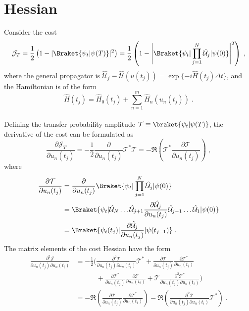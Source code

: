 \chapter{Hessian}

Consider the cost
\begin{equation}
	\mathcal{J}_T = \frac{1}{2} \left( 1- |\Braket{\psi_t | \psi (T)}|^2 \right)  = \frac{1}{2} \left( 1- \Bigg|\Braket{\psi_t | \prod_{j = 1}^{N} \hat{\mathcal{U}}_j |\psi (0)} \Bigg| ^2 \right) \; ,
\end{equation}
where the general propagator is $\hat{\mathcal{U}}_j \equiv \hat{\mathcal{U}} (u(t_j)) = \exp \{ -i \hat{H} (t_j) \Delta t \}$, and the Hamiltonian is of the form
\begin{equation}
	\hat{H}(t_j) =  \hat{H}_0 (t_j) + \sum_{n = 1}^{m}  \hat{H}_n (u_n (t_j)) \; .
\end{equation}\\
Defining the transfer probability amplitude $\mathcal{T} \equiv \braket{\psi_t | \psi (T)}$, the derivative of the cost can be formulated as
\begin{equation}
	\frac{\partial \mathcal{J}_T}{\partial u_n (t_j)} = - \frac{1}{2} \frac{\partial}{\partial u_n (t_j)}  \mathcal{T}^* \mathcal{T}   = - \Re \left( \mathcal{T}^* \frac{\partial \mathcal{T}}{\partial u_n (t_j)} \right) \; ,
\end{equation}
where
\begin{align}
	\frac{\partial \mathcal{T}}{\partial u_n (t_j)} &= \frac{\partial }{\partial u_n (t_j)} \Braket{\psi_t | \prod_{j = 1}^{N} \hat{\mathcal{U}}_j | \psi (0)} \nonumber \\
	&= \Braket{\psi_t | \hat{\mathcal{U}}_N \ldots \hat{\mathcal{U}}_{j+1} \frac{\partial \hat{\mathcal{U}}_{j}}{\partial u_n (t_j)} \hat{\mathcal{U}}_{j-1} \ldots \hat{\mathcal{U}}_{1} | \psi (0)} \nonumber \\
	&= \Braket{\psi_t (t_j) |  \frac{\partial \hat{\mathcal{U}}_{j}}{\partial u_n (t_j)}  | \psi (t_{j-1})} \; .
	\label{eq:singleDerivT}
\end{align}
The matrix elements of the cost Hessian have the form
\begin{align}
	\frac{\partial^2 \mathcal{J}}{\partial u_n (t_j) \partial u_n (t_i)} &= - \frac{1}{2} \bigg( \frac{\partial^2 \mathcal{T}}{\partial u_n (t_j)   \partial u_n (t_i)} \mathcal{T}^* + \frac{\partial \mathcal{T}}{\partial u_n (t_j)} \frac{\partial \mathcal{T}^*}{\partial u_n (t_i)} \nonumber \\
	&\qquad \quad + \frac{\partial \mathcal{T}^*}{\partial u_n (t_j)} \frac{\partial \mathcal{T}}{\partial u_n (t_i)} + \mathcal{T} \frac{\partial^2 \mathcal{T}^*}{\partial u_n (t_j)   \partial u_n (t_i)} \bigg) \nonumber \\
	&= - \Re \left( \frac{\partial \mathcal{T}}{\partial u_n (t_j)} \frac{\partial \mathcal{T}^*}{\partial u_n (t_i)} \right) - \Re \left( \frac{\partial^2 \mathcal{T}}{\partial u_n (t_j)   \partial u_n (t_i)} \mathcal{T}^* \right) \; .
\end{align}
